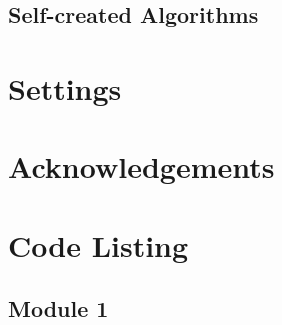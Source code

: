 \subsection{Self-created Algorithms}

\section{Settings}

\section{Acknowledgements}

\section{Code Listing}
\begin{landscape}
\subsection{Module 1}
\begin{comment}
\pythonfile[firstline=5]{./tex/function_programs/print_function.py}
\end{comment}
\end{landscape}
